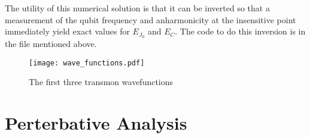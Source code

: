 \documentclass[twocolumn]{article}
\begin{document}
The utility of this numerical solution is that it can be inverted so that a measurement of the qubit frequency and anharmonicity at the insensitive point immediately yield exact values for $E_{J_0}$ and $E_C$. The code to do this inversion is in the file mentioned above.

\begin{figure}
\begin{centering}
\texttt{[image: wave\_functions.pdf]}
\par\end{centering}
\caption{The first three transmon wavefunctions}
\label{Fig:wavefunctions}
\end{figure}


\section{Perterbative Analysis}
\end{document}
